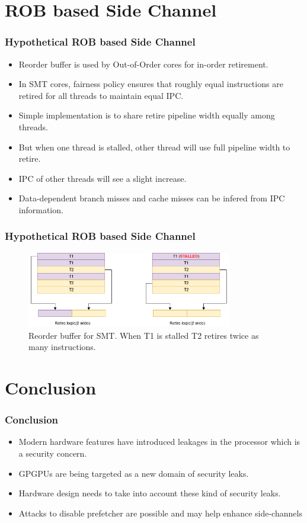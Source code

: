 \documentclass[10pt,usenames,dvipsnames]{beamer}
\begin{document}
\section{ROB based Side Channel}
\begin{frame}
\frametitle{Hypothetical ROB based Side Channel}
\begin{itemize}
    \item Reorder buffer is used by Out-of-Order cores for in-order retirement.
    \item In SMT cores, fairness policy ensures that roughly equal instructions are retired for all threads to maintain equal IPC.
    \item Simple implementation is to share retire pipeline width equally among threads.
    \item But when one thread is stalled, other thread will use full pipeline width to retire.
    \item IPC of other threads will see a slight increase.
    \item Data-dependent branch misses and cache misses can be infered from IPC information.
\end{itemize}
\end{frame}

\begin{frame}
\frametitle{Hypothetical ROB based Side Channel}
\begin{figure}
\centering
\includegraphics[width=0.8\textwidth]{rob_side_channel}
\caption{Reorder buffer for SMT. When T1 is stalled T2 retires twice as many instructions.}
\end{figure}
\end{frame}

\section{Conclusion}
\begin{frame}
\frametitle{Conclusion}
\begin{itemize}
    \item Modern hardware features have introduced leakages in the processor which is a security concern.
    \item GPGPUs are being targeted as a new domain of security leaks.
    \item Hardware design needs to take into account these kind of security leaks.
    \item Attacks to disable prefetcher are possible and may help enhance side-channels
\end{itemize}
\end{frame}
\end{document}
